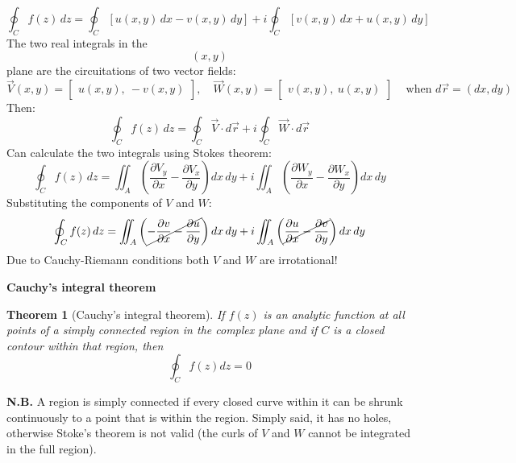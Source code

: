 \documentclass{article}
\newtheorem{theorem}{Theorem}
\begin{document}
\newpage
\begin{equation}
    \oint_{C} f(z) \, dz
= \oint_{C} \left[ u(x, y) \, dx - v(x, y) \, dy \right]
+ i \oint_{C} \left[ v(x, y) \, dx + u(x, y) \, dy \right]
\end{equation}
The two real integrals in the $$(x,y)$$ plane are the circuitations of two vector fields:
\begin{equation}
    \vec{V}(x, y) = \begin{bmatrix} u(x, y),\ -v(x, y) \end{bmatrix}, \quad
\vec{W}(x, y) = \begin{bmatrix} v(x, y),\ u(x, y) \end{bmatrix} \, \quad \text{when $d\vec{r} = (dx, dy)$}
\end{equation}
Then:
\begin{equation}
    \oint_C f(z)\,dz 
= \oint_C \vec{V} \cdot d\vec{r} 
+ i \oint_C \vec{W} \cdot d\vec{r}
\end{equation}
Can calculate the two integrals using Stokes theorem:
\begin{equation}
    \oint_C f(z) \, dz
= \iint_A \left( \frac{\partial V_y}{\partial x} - \frac{\partial V_x}{\partial y} \right) dx\,dy
+ i \iint_A \left( \frac{\partial W_y}{\partial x} - \frac{\partial W_x}{\partial y} \right) dx\,dy
\end{equation}
Substituting the components of $V$ and $W$:
\begin{equation}
    \oint_C f(z) \, dz =
\iint_A \left( \cancel{-\frac{\partial v}{\partial x} - \frac{\partial u}{\partial y}} \right) dx\,dy
+ i \iint_A \left( \cancel{\frac{\partial u}{\partial x} - \frac{\partial v}{\partial y}} \right) dx\,dy
\end{equation}
Due to Cauchy-Riemann conditions both $V$ and $W$ are irrotational!

\vspace{3mm} \noindent
\textbf{Cauchy’s integral theorem}
\begin{theorem}[Cauchy’s integral theorem]
    If $f(z)$ is an analytic function at all points of a simply connected region in the complex plane and if $C$ is a closed contour within that region, then
    \begin{equation}
        \oint_C f(z)dz = 0
    \end{equation}
\end{theorem}

\noindent
\textbf{N.B.} A region is simply connected if every closed curve within it can be shrunk continuously to a point that is within the region. Simply said, it has no holes, otherwise Stoke’s theorem is not valid (the curls of $V$ and $W$ cannot be integrated in the full region).
\end{document}
